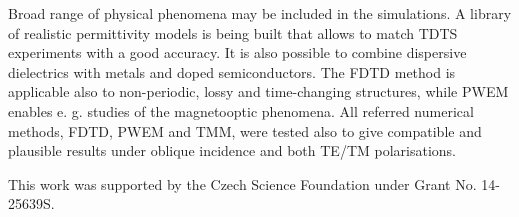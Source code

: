 Broad range of physical phenomena may be included in the simulations. A library of realistic permittivity models is being built that allows to match TDTS experiments with a good accuracy. It is also possible to combine dispersive dielectrics with metals and doped semiconductors. 
 The FDTD method is applicable also to non-periodic, lossy and time-changing structures, while PWEM enables e. g. studies of the magnetooptic phenomena.
All referred numerical methods, FDTD, PWEM and TMM, were tested also to give compatible and plausible results under oblique incidence and both TE/TM polarisations. 


This work was supported by the Czech Science Foundation under Grant No. 14-25639S.

